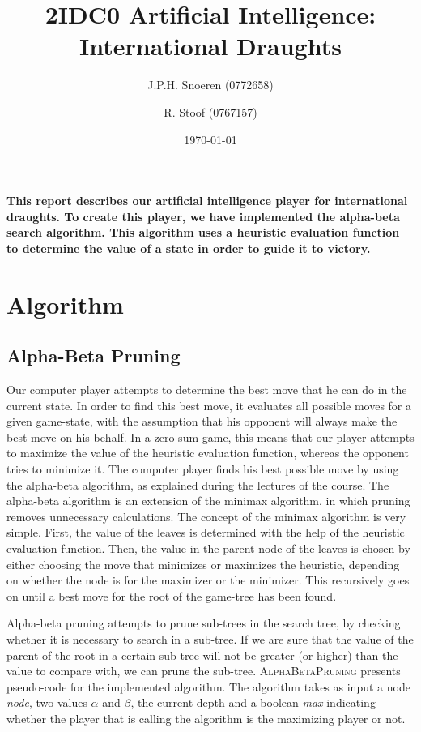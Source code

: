 \documentclass[10pt,a4paper]{article}
\author{J.P.H. Snoeren (0772658) \and R. Stoof (0767157)}
\date{\today}
\title{2IDC0 Artificial Intelligence: International Draughts}
\begin{document}
\maketitle
\textbf{This report describes our artificial intelligence player for international draughts. To create this player, we have implemented the alpha-beta search algorithm. This algorithm uses a heuristic evaluation function to determine the value of a state in order to guide it to victory.} 

\section{Algorithm}
\subsection{Alpha-Beta Pruning}
Our computer player attempts to determine the best move that he can do in the current state. In order to find this best move, it evaluates all possible moves for a given game-state, with the assumption that his opponent will always make the best move on his behalf. In a zero-sum game, this means that our player attempts to maximize the value of the heuristic evaluation function, whereas the opponent tries to minimize it. The computer player finds his best possible move by using the alpha-beta algorithm, as explained during the lectures of the course. The alpha-beta algorithm is an extension of the minimax algorithm, in which pruning removes unnecessary calculations. The concept of the minimax algorithm is very simple. First, the value of the leaves is determined with the help of the heuristic evaluation function. Then, the value in the parent node of the leaves is chosen by either choosing the move that minimizes or maximizes the heuristic, depending on whether the node is for the maximizer or the minimizer. This recursively goes on until a best move for the root of the game-tree has been found.

Alpha-beta pruning attempts to prune sub-trees in the search tree, by checking whether it is necessary to search in a sub-tree. If we are sure that the value of the parent of the root in a certain sub-tree will not be greater (or higher) than the value to compare with, we can prune the sub-tree. \textsc{AlphaBetaPruning} presents pseudo-code for the implemented algorithm. The algorithm takes as input a node \emph{node}, two values $\alpha$ and $\beta$, the current depth and a boolean \emph{max} indicating whether the player that is calling the algorithm is the maximizing player or not.
\end{document}
